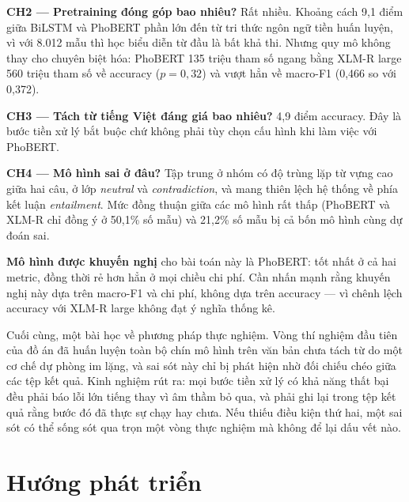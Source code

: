 \documentclass[12pt,a4paper,oneside]{report}
\begin{document}
\textbf{CH2 --- Pretraining đóng góp bao nhiêu?} Rất nhiều. Khoảng cách 9,1 điểm giữa
BiLSTM và PhoBERT phần lớn đến từ tri thức ngôn ngữ tiền huấn luyện, vì với 8.012 mẫu thì
học biểu diễn từ đầu là bất khả thi. Nhưng quy mô không thay cho chuyên biệt hóa: PhoBERT
135 triệu tham số ngang bằng XLM-R large 560 triệu tham số về accuracy ($p = 0{,}32$) và
vượt hẳn về macro-F1 (0,466 so với 0,372).

\textbf{CH3 --- Tách từ tiếng Việt đáng giá bao nhiêu?} 4,9 điểm accuracy. Đây là bước
tiền xử lý bắt buộc chứ không phải tùy chọn cấu hình khi làm việc với PhoBERT.

\textbf{CH4 --- Mô hình sai ở đâu?} Tập trung ở nhóm có độ trùng lặp từ vựng cao giữa hai
câu, ở lớp \textit{neutral} và \textit{contradiction}, và mang thiên lệch hệ thống về phía
kết luận \textit{entailment}. Mức đồng thuận giữa các mô hình rất thấp (PhoBERT và XLM-R
chỉ đồng ý ở 50,1\% số mẫu) và 21,2\% số mẫu bị cả bốn mô hình cùng dự đoán sai.

\textbf{Mô hình được khuyến nghị} cho bài toán này là PhoBERT: tốt nhất ở cả hai metric,
đồng thời rẻ hơn hẳn ở mọi chiều chi phí. Cần nhấn mạnh rằng khuyến nghị này dựa trên
macro-F1 và chi phí, không dựa trên accuracy --- vì chênh lệch accuracy với XLM-R large
không đạt ý nghĩa thống kê.

Cuối cùng, một bài học về phương pháp thực nghiệm. Vòng thí nghiệm đầu tiên của đồ án đã
huấn luyện toàn bộ chín mô hình trên văn bản chưa tách từ do một cơ chế dự phòng im lặng,
và sai sót này chỉ bị phát hiện nhờ đối chiếu chéo giữa các tệp kết quả. Kinh nghiệm rút
ra: mọi bước tiền xử lý có khả năng thất bại đều phải báo lỗi lớn tiếng thay vì âm thầm
bỏ qua, và phải ghi lại trong tệp kết quả rằng bước đó đã thực sự chạy hay chưa. Nếu thiếu
điều kiện thứ hai, một sai sót có thể sống sót qua trọn một vòng thực nghiệm mà không để
lại dấu vết nào.

\section{Hướng phát triển}
\end{document}
